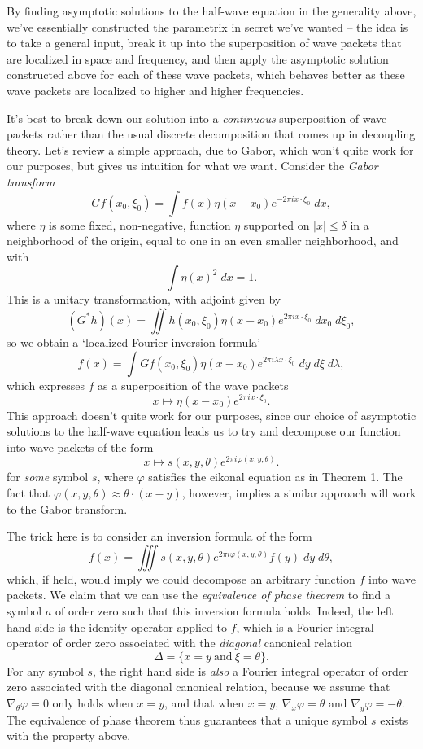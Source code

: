 \documentclass{article}
\theoremstyle{plain}
\theoremstyle{remark}
\theoremstyle{definition}
\begin{document}
By finding asymptotic solutions to the half-wave equation in the generality above, we've essentially constructed the parametrix in secret we've wanted -- the idea is to take a general input, break it up into the superposition of wave packets that are localized in space and frequency, and then apply the asymptotic solution constructed above for each of these wave packets, which behaves better as these wave packets are localized to higher and higher frequencies.

It's best to break down our solution into a \emph{continuous} superposition of wave packets rather than the usual discrete decomposition that comes up in decoupling theory. Let's review a simple approach, due to Gabor, which won't quite work for our purposes, but gives us intuition for what we want. Consider the \emph{Gabor transform}
%
\[ Gf(x_0,\xi_0) = \int f(x) \eta(x - x_0) e^{- 2 \pi i x \cdot \xi_0}\; dx, \]
%
where $\eta$ is some fixed, non-negative, function $\eta$ supported on $|x| \leq \delta$ in a neighborhood of the origin, equal to one in an even smaller neighborhood, and with
%
\[ \int \eta(x)^2\; dx = 1. \]
%
This is a unitary transformation, with adjoint given by
%
\[ (G^*h)(x) = \iint h(x_0,\xi_0) \eta(x - x_0) e^{2 \pi i x \cdot \xi_0}\; dx_0\; d\xi_0, \]
%
so we obtain a `localized Fourier inversion formula'
%
\[ f(x) = \int Gf(x_0,\xi_0) \eta(x - x_0) e^{2 \pi i \lambda x \cdot \xi_0}\; dy\; d\xi\; d\lambda, \]
%
which expresses $f$ as a superposition of the wave packets
%
\[ x \mapsto \eta(x - x_0) e^{2 \pi i x \cdot \xi_0}. \]
%
This approach doesn't quite work for our purposes, since our choice of asymptotic solutions to the half-wave equation leads us to try and decompose our function into wave packets of the form
%
\[ x \mapsto s(x,y,\theta) e^{2 \pi i \varphi(x,y,\theta)}. \]
%
for \emph{some} symbol $s$, where $\varphi$ satisfies the eikonal equation as in Theorem 1. The fact that $\varphi(x,y,\theta) \approx \theta \cdot (x - y)$, however, implies a similar approach will work to the Gabor transform.

The trick here is to consider an inversion formula of the form
%
\[ f(x) = \iiint s(x,y,\theta) e^{2 \pi i \varphi(x,y,\theta)} f(y)\; dy\; d\theta, \]
%
which, if held, would imply we could decompose an arbitrary function $f$ into wave packets. We claim that we can use the \emph{equivalence of phase theorem} to find a symbol $a$ of order zero such that this inversion formula holds. Indeed, the left hand side is the identity operator applied to $f$, which is a Fourier integral operator of order zero associated with the \emph{diagonal} canonical relation
%
\[ \Delta = \Big\{ x = y\ \text{and}\ \xi = \theta \Big\}. \]
%
For any symbol $s$, the right hand side is \emph{also} a Fourier integral operator of order zero associated with the diagonal canonical relation, because we assume that $\nabla_{\theta} \varphi = 0$ only holds when $x = y$, and that when $x = y$, $\nabla_x \varphi = \theta$ and $\nabla_{y} \varphi = - \theta$. The equivalence of phase theorem thus guarantees that a unique symbol $s$ exists with the property above.
\end{document}
